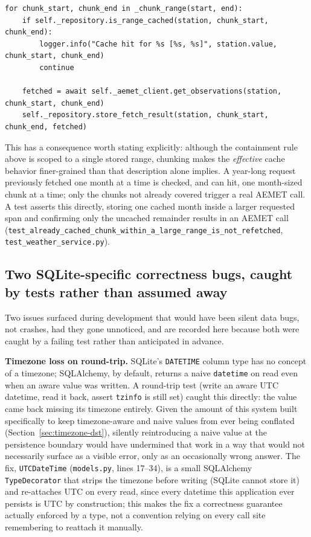 \documentclass[11pt,a4paper]{article}
\begin{document}
\begin{lstlisting}[caption={Cache coverage is checked per chunk, giving finer-grained reuse than the containment rule alone would suggest. \texttt{backend/app/services/weather\_service.py}, lines 82--94.}]
for chunk_start, chunk_end in _chunk_range(start, end):
    if self._repository.is_range_cached(station, chunk_start, chunk_end):
        logger.info("Cache hit for %s [%s, %s]", station.value, chunk_start, chunk_end)
        continue

    fetched = await self._aemet_client.get_observations(station, chunk_start, chunk_end)
    self._repository.store_fetch_result(station, chunk_start, chunk_end, fetched)
\end{lstlisting}

This has a consequence worth stating explicitly: although the containment
rule above is scoped to a single stored range, chunking makes the
\emph{effective} cache behavior finer-grained than that description alone
implies. A year-long request previously fetched one month at a time is
checked, and can hit, one month-sized chunk at a time; only the chunks not
already covered trigger a real AEMET call. A test asserts this directly,
storing one cached month inside a larger requested span and confirming
only the uncached remainder results in an AEMET call
(\texttt{test\_already\_cached\_chunk\_within\_a\_large\_range\_is\_not\_refetched},
\texttt{test\_weather\_service.py}).

\subsection{Two SQLite-specific correctness bugs, caught by tests rather than assumed away}

Two issues surfaced during development that would have been silent data
bugs, not crashes, had they gone unnoticed, and are recorded here because
both were caught by a failing test rather than anticipated in advance.

\textbf{Timezone loss on round-trip.} SQLite's \texttt{DATETIME} column
type has no concept of a timezone; SQLAlchemy, by default, returns a naive
\texttt{datetime} on read even when an aware value was written. A
round-trip test (write an aware UTC datetime, read it back, assert
\texttt{tzinfo} is still set) caught this directly: the value came back
missing its timezone entirely. Given the amount of this system built
specifically to keep timezone-aware and naive values from ever being
conflated (Section~\ref{sec:timezone-dst}), silently reintroducing a naive
value at the persistence boundary would have undermined that work in a way
that would not necessarily surface as a visible error, only as an
occasionally wrong answer. The fix, \texttt{UTCDateTime}
(\texttt{models.py}, lines 17--34), is a small SQLAlchemy
\texttt{TypeDecorator} that strips the timezone before writing (SQLite
cannot store it) and re-attaches UTC on every read, since every datetime
this application ever persists is UTC by construction; this makes the fix
a correctness guarantee actually enforced by a type, not a convention
relying on every call site remembering to reattach it manually.
\end{document}

